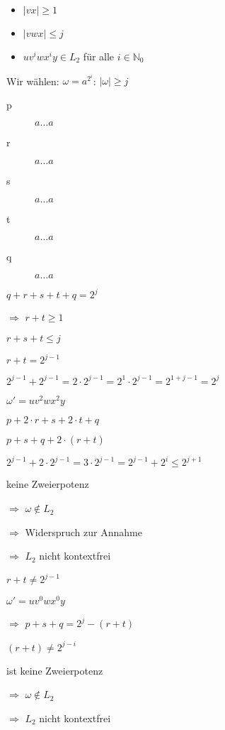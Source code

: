 \documentclass{bschlangaul-aufgabe}
\begin{document}
\begin{enumerate}
\begin{bAntwort}
\begin{itemize}
\item $|vx| \geq 1$
\item $|vwx| \leq j$
\item $u v^i w x^i y \in L_2$ für alle $i \in \mathbb{N}_0$
\end{itemize}

Wir wählen: $\omega = a^{2^i}$: $|\omega| \geq j$

\begin{description}
\item[p] $a \dots a$
\item[r] $a \dots a$
\item[s] $a \dots a$
\item[t] $a \dots a$
\item[q] $a \dots a$
\end{description}

$q + r + s + t + q = 2^j$

$\Rightarrow$ $r + t \geq 1$

$r + s + t \leq j$

%


$r + t = 2^{j-1}$

$2^{j-1} + 2^{j-1} = 2 \cdot 2^{j-1} =  2^1 \cdot 2^{j-1} =  2^{1+j-1} = 2^j$

$\omega' = u v^2 w x^2 y$

$p + 2 \cdot r + s + 2 \cdot t + q$

$p + s + q + 2 \cdot (r + t)$

$2^{j-1} + 2 \cdot 2^{j-1} = 3 \cdot 2^{j-1} = 2^{j-1} + 2^i \leq 2^{j+1}$

keine Zweierpotenz

$\Rightarrow$ $\omega \notin L_2$

$\Rightarrow$ Widerspruch zur Annahme

$\Rightarrow$ $L_2$ nicht kontextfrei

%


$r + t \neq 2^{j-1}$

$\omega' = u v^0 w x^0 y$

$\Rightarrow$ $p + s + q = 2^j - (r + t)$

$(r + t) \neq 2^{j-i}$

ist keine Zweierpotenz

$\Rightarrow$ $\omega \notin L_2$

$\Rightarrow$ $L_2$ nicht kontextfrei

\end{bAntwort}

\end{enumerate}
\end{document}

